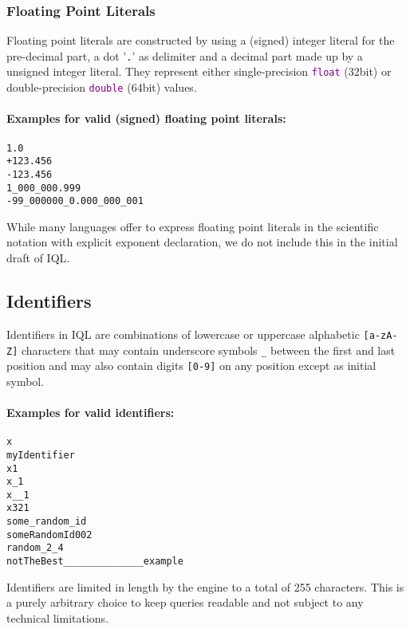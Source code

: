\documentclass[11pt,a4paper,portrait]{article}
\newcommand{\iql}{IQL\xspace}
\newcommand{\keyword}[1]{\textcolor{purple}{\texttt{#1}}}
\begin{document}
\subsubsection{Floating Point Literals}
\label{sec:floating-point-literals}

Floating point literals are constructed by using a (signed) integer literal for the pre-decimal part, a dot '\texttt{.}' as delimiter and a decimal part made up by a unsigned integer literal. They represent either single-precision \keyword{float} (32bit) or double-precision \keyword{double} (64bit) values.

\paragraph{Examples for valid (signed) floating point literals:}

\begin{verbatim}
1.0
+123.456
-123.456
1_000_000.999
-99_000000_0.000_000_001
\end{verbatim}

\noindent While many languages offer to express floating point literals in the scientific notation with explicit exponent declaration, we do not include this in the initial draft of \iql.

\subsection{Identifiers}
\label{sec:identifiers}

\noindent Identifiers in \iql are combinations of lowercase or uppercase alphabetic \texttt{[a-zA-Z]} characters that may contain underscore symbols \texttt{\_} between the first and last position and may also contain digits \texttt{[0-9]} on any position except as initial symbol.

\paragraph{Examples for valid identifiers:}

\begin{verbatim}
x
myIdentifier
x1
x_1
x__1
x321
some_random_id
someRandomId002
random_2_4
notTheBest______________example
\end{verbatim}

\noindent Identifiers are limited in length by the engine to a total of 255 characters. This is a purely arbitrary choice to keep queries readable and not subject to any technical limitations.
\end{document}
